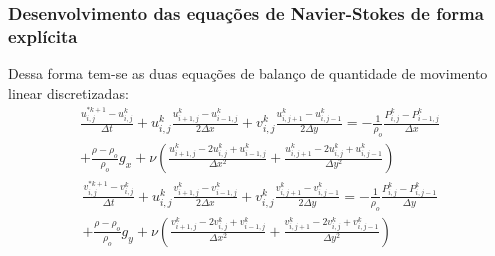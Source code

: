 \documentclass[xcolor=dvipsnames,10pt,aspectratio=169]{beamer}
\begin{document}
	\begin{frame}
		\frametitle{Desenvolvimento das equações de Navier-Stokes  de forma explícita}
		Dessa forma tem-se as duas equações de balanço de quantidade de movimento linear discretizadas:
		\begin{equation}
			\begin{split}
			\frac{u_{i , j}^{\ast k + 1} - u_{i , j}^{k}}{\Delta t} + u_{i , j}^{k}\frac{u_{i + 1 , j}^k - u_{i - 1 , j}^k  }{2 \Delta x} + v_{i , j}^{k}\frac{u_{i , j+ 1}^k - u_{i, j-1}^k  }{2 \Delta y} =  -\frac{1}{\rho_o} \frac{P_{i, j}^k - P_{i - 1 , j}^k}{\Delta x} \\ + \frac{\rho - 	\rho_o}{\rho_o} g_x + \nu \left( \frac{u_{i+1 , j}^{k} - 2 u_{i,j}^{k} + u_{i-1,j}^{k}}{\Delta x^2} + \frac{u_{i , j+1}^{k} - 2 u_{i,j}^{k} + u_{i,j-1}^{k}}{\Delta y^2} \right)
			\end{split}
		\end{equation}
		\begin{equation}
			\begin{split}
			\frac{v_{i , j}^{\ast k + 1} - v_{i , j}^{k}}{\Delta t} + u_{i , j}^{k}\frac{v_{i + 1 , j}^k - v_{i - 1 , j}^k  }{2 \Delta x} + v_{i , j}^{k}\frac{v_{i , j+ 1}^k - v_{i, j-1}^k  }{2 \Delta y} =  -\frac{1}{\rho_o} \frac{P_{i , j}^k - P_{i , j - 1}^k}{\Delta y} \\ + \frac{\rho - \rho_o}{\rho_o} g_y + \nu \left( \frac{v_{i+1 , j}^{k} - 2 v_{i,j}^{k} + v_{i-1,j}^{k}}{\Delta x^2} + \frac{v_{i , j+1}^{k} - 2 v_{i,j}^{k} + v_{i,j-1}^{k}}{\Delta y^2} \right)
			\end{split}
		\end{equation}
	\end{frame}
\end{document}
